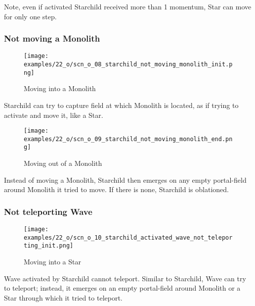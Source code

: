 Note, even if activated Starchild received more than 1 momentum, Star can move for only one step.

\clearpage %

\subsubsection*{Not moving a Monolith}

\noindent
\begin{wrapfigure}[4]{l}{0.4\textwidth}
\centering
\texttt{[image: examples/22\_o/scn\_o\_08\_starchild\_not\_moving\_monolith\_init.png]}
\caption{Moving into a Monolith}
\label{fig:scn_o_08_starchild_not_moving_monolith_init}
\end{wrapfigure}
Starchild can try to capture field at which Monolith is located, as if trying to activate and move
it, like a Star.

\vspace*{7.1\baselineskip}
\noindent
\begin{wrapfigure}[5]{l}{0.4\textwidth}
\centering
\texttt{[image: examples/22\_o/scn\_o\_09\_starchild\_not\_moving\_monolith\_end.png]}
\caption{Moving out of a Monolith}
\label{fig:scn_o_09_starchild_not_moving_monolith_end}
\end{wrapfigure}
Instead of moving a Monolith, Starchild then emerges on any empty portal-field around Monolith it
tried to move. If there is none, Starchild is oblationed.

\clearpage %

\subsubsection*{Not teleporting Wave}

\noindent
\begin{wrapfigure}[6]{l}{0.4\textwidth}
\centering
\texttt{[image: examples/22\_o/scn\_o\_10\_starchild\_activated\_wave\_not\_teleporting\_init.png]}
\caption{Moving into a Star}
\label{fig:scn_o_10_starchild_activated_wave_not_teleporting_init}
\end{wrapfigure}
Wave activated by Starchild cannot teleport. Similar to Starchild, Wave can try to teleport;
instead, it emerges on an empty portal-field around Monolith or a Star through which it tried
to teleport.

